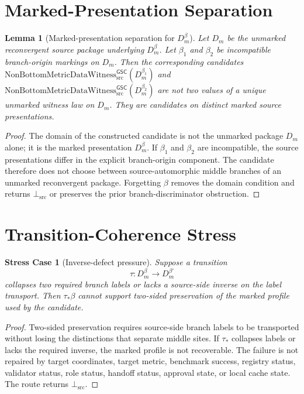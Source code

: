 \documentclass[11pt]{article}
\newcommand{\Witness}{\mathrm{NonBottomMetricDataWitness}_{\mathrm{src}}^{\mathsf{GSC}}}
\newcommand{\BottomSrc}{\bot_{\mathrm{src}}}
\newcommand{\Dmbeta}{D_m^{\beta}}
\newtheorem{lemma}{Lemma}
\newtheorem{stresscase}{Stress Case}
\begin{document}
\section{Marked-Presentation Separation}

\begin{lemma}[Marked-presentation separation for \(\Dmbeta\)]
Let \(D_m\) be the unmarked reconvergent source package underlying
\(\Dmbeta\). Let \(\beta_1\) and \(\beta_2\) be incompatible branch-origin
markings on \(D_m\). Then the corresponding candidates
\(\Witness(D_m^{\beta_1})\) and \(\Witness(D_m^{\beta_2})\) are not two
values of a unique unmarked witness law on \(D_m\). They are candidates on
distinct marked source presentations.
\end{lemma}

\begin{proof}
The domain of the constructed candidate is not the unmarked package \(D_m\)
alone; it is the marked presentation \(D_m^\beta\). If \(\beta_1\) and
\(\beta_2\) are incompatible, the source presentations differ in the explicit
branch-origin component. The candidate therefore does not choose between
source-automorphic middle branches of an unmarked reconvergent package.
Forgetting \(\beta\) removes the domain condition and returns \(\BottomSrc\)
or preserves the prior branch-discriminator obstruction.
\end{proof}

\section{Transition-Coherence Stress}

\begin{stresscase}[Inverse-defect pressure]
Suppose a transition
\[
  \tau:D_m^\beta\to D_m^{\beta'}
\]
collapses two required branch labels or lacks a source-side inverse on the
label transport. Then \(\tau_\ast\beta\) cannot support two-sided preservation
of the marked profile used by the candidate.
\end{stresscase}

\begin{proof}
Two-sided preservation requires source-side branch labels to be transported
without losing the distinctions that separate middle sites. If
\(\tau_\ast\) collapses labels or lacks the required inverse, the marked
profile is not recoverable. The failure is not repaired by target
coordinates, target metric, benchmark success, registry status, validator
status, role status, handoff status, approval state, or local cache state. The
route returns \(\BottomSrc\).
\end{proof}
\end{document}
